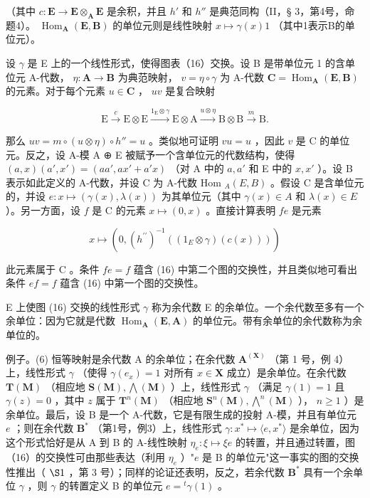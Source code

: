 （其中 \(c: \mathbf{E} \to \mathbf{E} \otimes_{\mathbf{A}} \mathbf{E}\) 是余积，并且 \(h'\) 和 \(h''\) 是典范同构（II，§ 3，第4号，命题4）。 \(\operatorname{Hom}_{\mathbf{A}}(\mathbf{E}, \mathbf{B})\) 的单位元则是线性映射 \(x \mapsto \gamma(x)1\) （其中1表示B的单位元）。

设 \(\gamma\) 是 E 上的一个线性形式，使得图表（16）交换。设 B 是带单位元 1 的含单位元 A-代数， \(\eta: \mathbf{A} \to \mathbf{B}\) 为典范映射， \(v = \eta \circ \gamma\) 为 A-代数 \(\mathbf{C} = \operatorname{Hom}_{\mathbf{A}}(\mathbf{E}, \mathbf{B})\) 的元素。对于每个元素 \(u \in \mathbf{C}\) ， \(uv\) 是复合映射

\[
\mathrm{E} \xrightarrow {c} \mathrm{E} \otimes \mathrm{E} \xrightarrow {1 _ {\mathrm{E}} \otimes \gamma} \mathrm{E} \otimes \mathrm{A} \xrightarrow {u \otimes \eta} \mathrm{B} \otimes \mathrm{B} \xrightarrow {m} \mathrm{B}.\tag{17}
\]

那么 \(uv = m \circ (u \otimes \eta) \circ h'' = u\) 。类似地可证明 \(vu = u\) ，因此 \(v\) 是 C 的单位元。反之，设 A-模 A ⊕ E 被赋予一个含单位元的代数结构，使得 \((a, x)(a', x') = (aa', ax' + a'x)\) （对 A 中的 \(a, a'\) 和 E 中的 \(x, x'\) ）。设 B 表示如此定义的 A-代数，并设 C 为 A-代数 Hom \(_A(E, B)\) 。假设 C 是含单位元的，并设 \(e: x \mapsto (\gamma(x), \lambda(x))\) 为其单位元（其中 \(\gamma(x) \in A\) 和 \(\lambda(x) \in E\) ）。另一方面，设 \(f\) 是 C 的元素 \(x \mapsto (0, x)\) 。直接计算表明 \(fe\) 是元素

\[
x \mapsto (0, (h ^ {\prime \prime}) ^ {- 1} ((1 _ {E} \otimes \gamma) (c (x))))
\]

此元素属于 C 。条件 \(fe = f\) 蕴含 (16) 中第二个图的交换性，并且类似地可看出条件 \(ef = f\) 蕴含 (16) 中第一个图的交换性。

E 上使图 (16) 交换的线性形式 \(\gamma\) 称为余代数 E 的余单位。一个余代数至多有一个余单位：因为它就是代数 \(\operatorname{Hom}_{\mathbf{A}}(\mathbf{E}, \mathbf{A})\) 的单位元。带有余单位的余代数称为余单位的。

例子。(6) 恒等映射是余代数 A 的余单位；在余代数 \(\mathbf{A}^{(\mathbf{X})}\) （第 1 号，例 4）上，线性形式 \(\gamma\) （使得 \(\gamma(e_x) = 1\) 对所有 \(x \in \mathbf{X}\) 成立）是余单位。在余代数 \(\mathbf{T}(\mathbf{M})\) （相应地 \(\mathbf{S}(\mathbf{M}), \bigwedge(\mathbf{M})\) ）上，线性形式 \(\gamma\) （满足 \(\gamma(1) = 1\) 且 \(\gamma(z) = 0\) ，其中 \(z\) 属于 \(\mathbf{T}^n(\mathbf{M})\) （相应地 \(\mathbf{S}^n(\mathbf{M}), \bigwedge^n(\mathbf{M})\) ）， \(n \geqslant 1\) ）是余单位。最后，设 B 是一个 A-代数，它是有限生成的投射 A-模，并且有单位元 \(e\) ；则在余代数 \(\mathbf{B}^*\) （第1号，例3）上，线性形式 \(\gamma: x^* \mapsto \langle e, x^* \rangle\) 是余单位，因为这个形式恰好是从 A 到 B 的 A-线性映射 \(\eta_e: \xi \mapsto \xi e\) 的转置，并且通过转置，图（16）的交换性可由那些表达（利用 \(\eta_e\) ）"\(e\) 是 B 的单位元"这一事实的图的交换性推出（ \(\S 1\) ，第 3 号）；同样的论证还表明，反之，若余代数 \(\mathbf{B}^*\) 具有一个余单位 \(\gamma\) ，则 \(\gamma\) 的转置定义 B 的单位元 \(e = {}^t\gamma(1)\) 。

